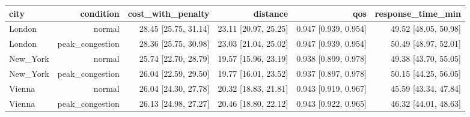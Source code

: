 \begin{tabular}{lrrrrr}
\toprule
city & condition & cost\_with\_penalty & distance & qos & response\_time\_min \\
\midrule
London & normal & 28.45 [25.75, 31.14] & 23.11 [20.97, 25.25] & 0.947 [0.939, 0.954] & 49.52 [48.05, 50.98] \\
London & peak\_congestion & 28.36 [25.75, 30.98] & 23.03 [21.04, 25.02] & 0.947 [0.939, 0.954] & 50.49 [48.97, 52.01] \\
New\_York & normal & 25.74 [22.70, 28.79] & 19.57 [15.96, 23.19] & 0.938 [0.899, 0.978] & 49.38 [43.70, 55.05] \\
New\_York & peak\_congestion & 26.04 [22.59, 29.50] & 19.77 [16.01, 23.52] & 0.937 [0.897, 0.978] & 50.15 [44.25, 56.05] \\
Vienna & normal & 26.04 [24.30, 27.78] & 20.32 [18.83, 21.81] & 0.943 [0.919, 0.967] & 45.59 [43.34, 47.84] \\
Vienna & peak\_congestion & 26.13 [24.98, 27.27] & 20.46 [18.80, 22.12] & 0.943 [0.922, 0.965] & 46.32 [44.01, 48.63] \\
\bottomrule
\end{tabular}
